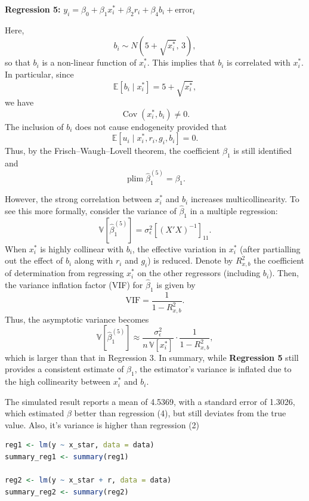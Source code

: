 \documentclass[a4paper,12pt]{article} %
\theoremstyle{nonitalic}
\newenvironment{solution}[1]
  {\renewcommand\theinnercustomsol{#1}\innercustomsol}
  {\endinnercustomsol}
\newcounter{solutionctr}
\renewcommand{\thesolutionctr}{(\alph{solutionctr})}
\newenvironment{autosolution}
  {\stepcounter{solutionctr}\begin{solution}{\thesolutionctr}}
  {\end{solution}}
\begin{document}
\begin{autosolution}
\begin{lstlisting}[language=R]

\end{lstlisting}

\textbf{Regression 5:} $y_i = \beta_0 + \beta_1 x^*_i + \beta_2 r_i + \beta_4 b_i + \text{error}_i$

Here,
\[
b_i \sim N\left(5+\sqrt{x_i^*},\,3\right),
\]
so that $b_i$ is a non-linear function of $x_i^*$. 
This implies that $b_i$ is correlated with $x_i^*$. 
In particular, since
\[
\mathbb{E}[b_i\mid x_i^*] = 5 + \sqrt{x_i^*},
\]
we have
\[
\operatorname{Cov}(x_i^*, b_i) \neq 0.
\]
The inclusion of $b_i$ does not cause endogeneity provided that 
\[
\mathbb{E}[u_i \mid x_i^*, r_i, g_i, b_i] = 0.
\]
Thus, by the Frisch--Waugh--Lovell theorem, 
the coefficient $\beta_1$ is still identified and
\[
\operatorname*{plim}\hat{\beta}_1^{(5)} = \beta_1.
\]

However, the strong correlation between $x_i^*$ and $b_i$ increases multicollinearity. 
To see this more formally, consider the variance of $\hat{\beta}_1$ in a multiple regression:
\[
\mathbb{V}[\hat{\beta}_1^{(5)}] = \sigma_{\epsilon}^2 \left[(X'X)^{-1}\right]_{11}.
\]
When $x_i^*$ is highly collinear with $b_i$, 
the effective variation in $x_i^*$ 
(after partialling out the effect of $b_i$ along with $r_i$ and $g_i$) 
is reduced. 
Denote by $R^2_{x,b}$ the coefficient of determination from 
regressing $x_i^*$ on the other regressors (including $b_i$). 
Then, the variance inflation factor (VIF) for $\hat{\beta}_1$ is given by
\[
\text{VIF} = \frac{1}{1-R^2_{x,b}}.
\]
Thus, the asymptotic variance becomes
\[
\mathbb{V}[\hat{\beta}_1^{(5)}] \approx \frac{\sigma_{\epsilon}^2}{n\,\mathbb{V}[x_i^*]}\cdot \frac{1}{1-R^2_{x,b}},
\]
which is larger than that in Regression 3. 
In summary, while \textbf{Regression 5} still provides a consistent estimate of $\beta_1$, 
the estimator's variance is inflated due to the high collinearity between $x_i^*$ and $b_i$.

The simulated result reports a mean of 4.5369, with a standard error of 1.3026, which estimated $\beta$ better than regression (4), but still deviates from the true value.
Also, it's variance is higher than regression (2)

\begin{lstlisting}[language=R]
reg1 <- lm(y ~ x_star, data = data)
summary_reg1 <- summary(reg1)

reg2 <- lm(y ~ x_star + r, data = data)
summary_reg2 <- summary(reg2)


\end{lstlisting}
\end{autosolution}
\end{document}
